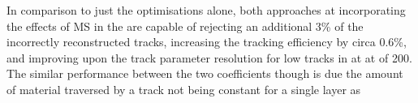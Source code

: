 {In comparison to just the \HT optimisations alone, both approaches at incorporating the effects of MS in the \KF are capable of rejecting an additional 3\% of the incorrectly reconstructed tracks, increasing the tracking efficiency by circa 0.6\%, and improving upon the track parameter resolution for low \pT tracks in \ttbar at at \PU of 200.
The similar performance between the two coefficients though is due the amount of material traversed by a track not being constant for a single layer as 





}
